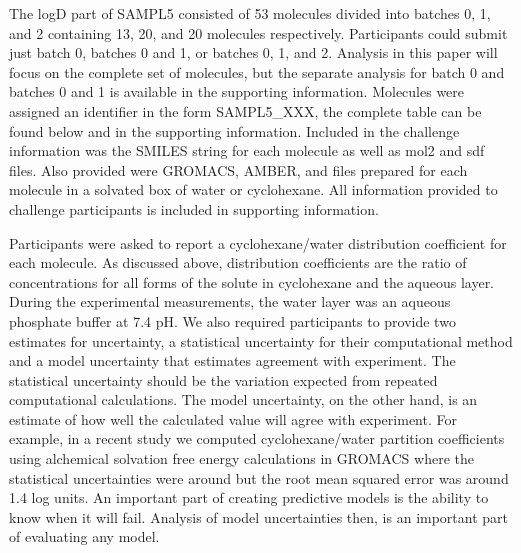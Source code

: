 The logD part of SAMPL5 consisted of 53 molecules divided into batches 0, 1, and 2 containing 13, 20, and 20 molecules respectively. 
Participants could submit just batch 0, batches 0 and 1, or batches 0, 1, and 2. 
Analysis in this paper will focus on the complete set of molecules, but the separate analysis for batch 0 and batches 0 and 1 is available in the supporting information. %
Molecules were assigned an identifier in the form SAMPL5\_XXX, the complete table can be found below and in the supporting information. 
Included in the challenge information was the SMILES string for each molecule as well as mol2 and sdf files. %
Also provided were GROMACS, AMBER, and %
files prepared for each molecule in a solvated box of water or cyclohexane. 
All information provided to challenge participants is included in supporting information. 

Participants were asked to report a cyclohexane/water distribution coefficient for each molecule. 
As discussed above, distribution coefficients are the ratio of concentrations for all forms of the solute in cyclohexane and the aqueous layer. 
During the experimental measurements, the water layer was an aqueous phosphate %
buffer at 7.4 pH. 
We also required participants to provide two estimates for uncertainty, a statistical uncertainty for their computational method and a model uncertainty that estimates agreement with experiment.  
The statistical uncertainty should be the variation expected from repeated computational calculations. 
The model uncertainty, on the other hand, is an estimate of how well the calculated value will agree with experiment. 
For example, in a recent study we computed cyclohexane/water partition coefficients using alchemical solvation free energy calculations in GROMACS where the statistical uncertainties were around %
but the root mean squared error was around 1.4 log units. 
An important part of creating predictive models is the ability to know when it will fail. 
Analysis of model uncertainties then, is an important part of evaluating any model. 

